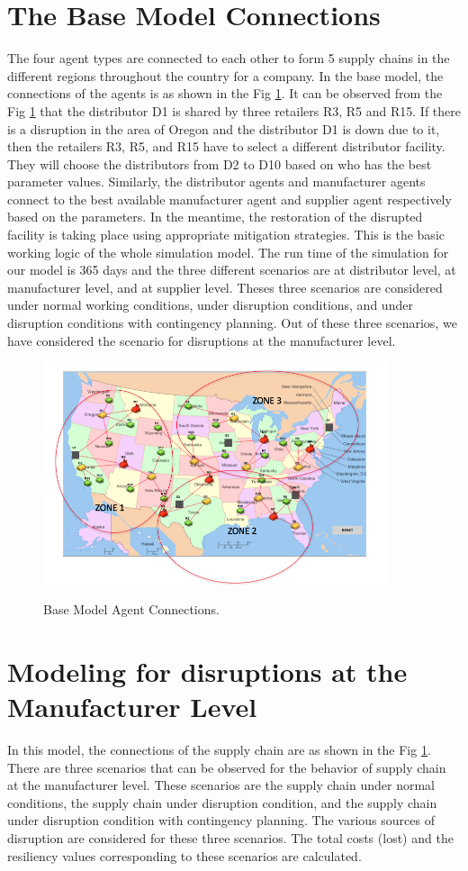\newpage
\section{The Base Model Connections}
The four agent types are connected to each other to form 5 supply chains in the different regions throughout the country for a company. In the base model, the connections of the agents is as shown in the Fig \ref{Base}. It can be observed from the Fig \ref{Base} that the distributor D1 is shared by three retailers R3, R5 and R15. If there is a disruption in the area of Oregon and the distributor D1 is down due to it, then the retailers R3, R5, and R15 have to select a different distributor facility. They will choose the distributors from D2 to D10 based on who has the best parameter values. Similarly, the distributor agents and manufacturer agents connect to the best available manufacturer agent and supplier agent respectively based on the parameters. In the meantime, the restoration of the disrupted facility is taking place using appropriate mitigation strategies. This is the basic working logic of the whole simulation model. The run time of the simulation for our model is 365 days and the three different scenarios are at distributor level, at manufacturer level, and at supplier level. Theses three scenarios are considered under normal working conditions, under disruption conditions, and under disruption conditions with contingency planning. Out of these three scenarios, we have considered the scenario for disruptions at the manufacturer level.

\begin{figure}[H]
  \centering
  \includegraphics[width=4.0in]{figures/pdf/Basic-connections.png}\\
  \caption{Base Model Agent Connections.}\label{Base}
\end{figure}


\section{Modeling for disruptions at the Manufacturer Level}
 In this model, the connections of the supply chain are as shown in the Fig \ref{Base}. There are three scenarios that can be observed for the behavior of supply chain at the manufacturer level. These scenarios are the supply chain under normal conditions, the supply chain under disruption condition, and the supply chain under disruption condition with contingency planning. The various sources of disruption are considered for these three scenarios. The total costs (lost) and the resiliency values corresponding to these scenarios are calculated.  
 
